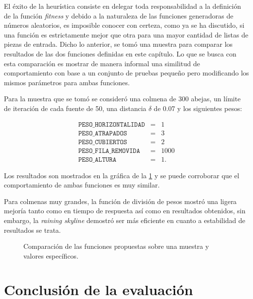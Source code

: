 El éxito de la heurística consiste en delegar toda responsabilidad a la definición 
de la función \textit{fitness} y debido a la naturaleza de las funciones generadoras 
de números aleatorios, es imposible conocer con certeza, como ya se ha discutido, 
si una función es estrictamente mejor que otra para una mayor cantidad de listas 
de piezas de entrada. Dicho lo anterior, se tomó una muestra para comparar los resultados 
de las dos funciones definidas en este capítulo. Lo que se busca con esta comparación 
es mostrar de manera informal una similitud de comportamiento con base a un conjunto 
de pruebas pequeño pero modificando los mismos parámetros para ambas funciones.

Para la muestra que se tomó se consideró una colmena de 300 abejas, un límite de 
iteración de cada fuente de 50, una distancia $\delta$ de 0.07 y los siguientes 
pesos: 

 \begin{displaymath} 
  \begin{array}{rcl}
    \texttt{PESO\_HORIZONTALIDAD} & = & 1 \\
    \texttt{PESO\_ATRAPADOS} & = & 3  \\
    \texttt{PESO\_CUBIERTOS} & = & 2  \\
    \texttt{PESO\_FILA\_REMOVIDA} & = & 1000  \\
    \texttt{PESO\_ALTURA} & = & 1.  
  \end{array}
\end{displaymath}

Los resultados son mostrados en la gráfica de la \cref{fig:dosfunciones} 
y se puede corroborar que el comportamiento de ambas funciones es muy similar. 

Para colmenas muy grandes, la función de división de pesos mostró una ligera 
mejoría tanto como en tiempo de respuesta así como en resultados obtenidos, sin 
embargo, la \emph{raining skyline} demostró ser más eficiente en cuanto a estabilidad 
de resultados se trata.

 \begin{figure}[H]

\caption[short caption]{Comparación de las funciones propuestas sobre una muestra 
y valores específicos.}
\label{fig:dosfunciones}
\end{figure} 


\section{Conclusión de la evaluación}

